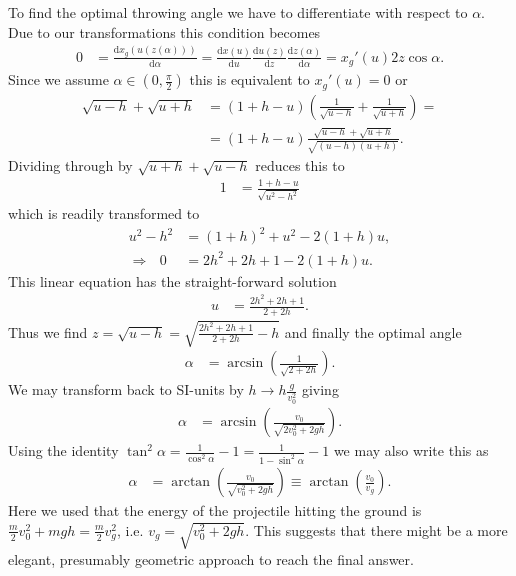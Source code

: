 \documentclass[english, parskip=full]{scrartcl}
\newcommand{\kla}{}
\newcommand{\tecxt}{}
\begin{document}
To find the optimal throwing angle we have to differentiate with respect to $\alpha$. 
Due to our transformations this condition becomes
\begin{align}
0 &= \frac{\tecxt\text{d} x_g(u(z(\alpha)))}{\tecxt\text{d}\alpha} = \frac{\tecxt\text{d}x(u)}{\tecxt\text{d}u} \frac{\tecxt\text{d}u(z)}{\tecxt\text{d}z} \frac{\tecxt\text{d}z(\alpha)}{\tecxt\text{d}\alpha} = x_g'(u) 2z \cos\alpha.
\end{align}
Since we assume $\alpha \in (0, \frac{\pi}{2})$ this is equivalent to $x_g'(u) = 0$ or
\begin{align}
\sqrt{u - h} + \sqrt{u + h} &= \kla\left( 1 + h - u \right) \left( \frac{1}{\sqrt{u - h}} + \frac{1}{\sqrt{u + h}} \right) = \\
&= (1 + h - u) \frac{\sqrt{u - h} + \sqrt{u + h}}{\sqrt{(u - h)(u + h)}}.
\end{align}
Dividing through by $\sqrt{u + h} + \sqrt{u - h}$ reduces this to
\begin{align}
1 &= \frac{1 + h - u}{\sqrt{u^2 - h^2}}
\end{align}
which is readily transformed to 
\begin{align}
u^2 - h^2 &= (1 + h)^2 + u^2 - 2(1+h)u,\\
\Rightarrow\ \ \ 0 &= 2h^2 + 2h + 1 - 2(1+h)u.
\end{align}
This linear equation has the straight-forward solution
\begin{align}
u &= \frac{2h^2 + 2h + 1}{2 + 2h}.
\end{align}
Thus we find $z=\sqrt{u - h} = \sqrt{\frac{2h^2 + 2h + 1}{2 + 2h} - h}$ and finally the optimal angle
\begin{align}
\alpha &= \arcsin \kla\left( \frac{1}{\sqrt{2 + 2h}} \right).
\end{align}
We may transform back to SI-units by $h\rightarrow h \frac{g}{v_0^2}$ giving
\begin{align}
\alpha  &= \arcsin \kla\left( \frac{v_0}{\sqrt{2v_0^2 + 2gh}} \right).
\end{align}
Using the identity $\tan^2\alpha = \frac{1}{\cos^2\alpha} - 1 = \frac{1}{1 - \sin^2\alpha} - 1$ we may also write this as
\begin{align}
\alpha &= \arctan \kla\left( \frac{v_0}{\sqrt{v_0^2 + 2gh}} \right) \equiv \arctan \kla\left( \frac{v_0}{v_g} \right).
\end{align}
Here we used that the energy of the projectile hitting the ground is $\frac{m}{2}v_0^2 + mgh = \frac{m}{2} v_g^2$, i.e. $v_g = \sqrt{v_0^2 + 2gh}$.
This suggests that there might be a more elegant, presumably geometric approach to reach the final answer.


\end{document}
